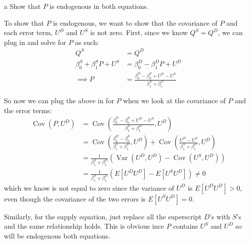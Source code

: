 \documentclass{article}
\begin{document}
\begin{problem}{a}
Show that $P$ is endogenous in both equations.
\end{problem}
\begin{solution}
To show that $P$ is endogenous, we want to show that the covariance of $P$ and each error term, $U^D$ and $U^S$ is not zero. First, since we know $Q^S=Q^D$, we can plug in and solve for $P$ as such:
\begin{align*}
    Q^S &= Q^D \\
    \beta_{0}^{S}+\beta_{1}^{S} P+U^{S} &= \beta_{0}^{D}-\beta_{1}^{D} P+U^{D}\\
    \implies P &= \frac{\beta_{0}^{D} - \beta_{0}^{S} + U^D - U^S}{\beta_1^S+\beta_1^D}
\end{align*}

So now we can plug the above in for $P$ when we look at the covariance of $P$ and the error terms:
\begin{align*}
    \operatorname{Cov}(P,U^D) &= \operatorname{Cov}\left(\frac{\beta_{0}^{D} - \beta_{0}^{S} + U^D - U^S}{\beta_1^S+\beta_1^D}, U^D \right) \\
    &= \operatorname{Cov}\left(\frac{\beta_{0}^{D} - \beta_{0}^{S}}{\beta_1^S+\beta_1^D}, U^D \right) + \operatorname{Cov}\left( \frac{U^D - U^S}{\beta_1^S+\beta_1^D}, U^D \right) \\
    &= \frac{1}{\beta_1^S+\beta_1^D} \left( \operatorname{Var}\left(U^D, U^D \right) - \operatorname{Cov}\left(U^S, U^D \right) \right) \\
    &= \frac{1}{\beta_1^S+\beta_1^D} \left( E[U^D U^D] - E[U^S U^D] \right) \neq 0
\end{align*}
which we know is not equal to zero since the variance of $U^D$ is $E[U^D U^D]>0$, even though the covariance of the two errors is $E[U^S U^D]=0$.

Similarly, for the supply equation, just replace all the superscript $D$'s with $S$'s and the same relationship holds. This is obvious ince $P$ contains $U^S$ and $U^D$ so will be endogenous both equations.
\end{solution}
\end{document}
